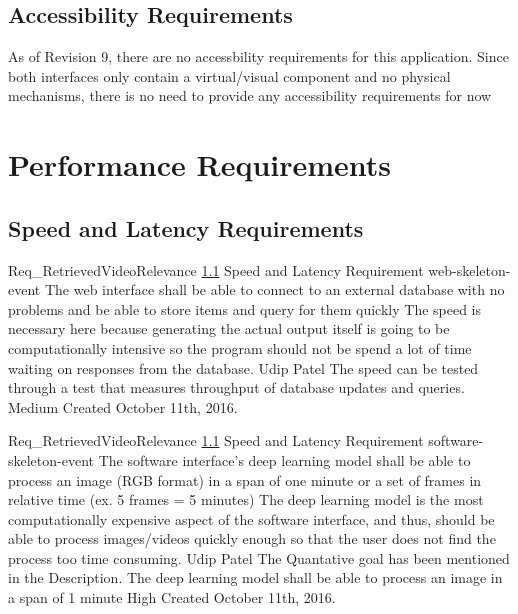 \documentclass{scrreprt}
\begin{document}
\subsection{Accessibility Requirements}
\label{req-accessibility}
As of Revision 9, there are no accessbility requirements for this application.
Since both interfaces only contain a virtual/visual component and no physical
mechanisms, there is no need to provide any accessibility requirements for now

\section{Performance Requirements}

\subsection{Speed and Latency Requirements}
\label{req-speed-latency}

\requirement
{Req_RetrievedVideoRelevance}
{\ref{req-speed-latency} Speed and Latency Requirement}
{web-skeleton-event}
{The web interface shall be able to connect to an external database with no problems and be able to store items and query for them quickly }
{The speed is necessary here because generating the actual output itself is going to be computationally intensive so the program should not be spend a lot of time waiting on responses from the database.}
{Udip Patel}
{The speed can be tested through a test that measures throughput of database updates and queries.}
{Medium}
{Created October 11th, 2016.}

\requirement
{Req_RetrievedVideoRelevance}
{\ref{req-speed-latency} Speed and Latency Requirement}
{software-skeleton-event}
{The software interface's deep learning model shall be able to process an image (RGB format) in a span of one minute or a set of frames in relative time (ex. 5 frames = 5 minutes)}
{The deep learning model is the most computationally expensive aspect of the software interface, and thus, should be able to process images/videos quickly enough so that the user does not find the process too time consuming.}
{Udip Patel}
{The Quantative goal has been mentioned in the Description. The deep learning model shall be able to process an image in a span of 1 minute}
{High}
{Created October 11th, 2016.}
\end{document}
